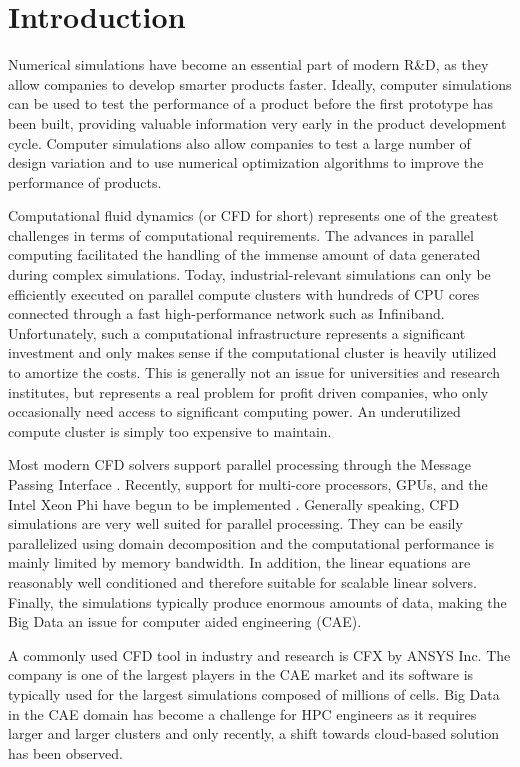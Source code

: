 \documentclass[3p,times]{elsarticle}
\begin{document}

\section{Introduction} 
\label{sec:introduction}

Numerical simulations have become an essential part of modern R\&D, as they allow companies to develop smarter products faster. Ideally, computer simulations can be used to test the performance of a product before the first prototype has been built, providing valuable information very early in the product development cycle. Computer simulations also allow companies to test a large number of design variation and to use numerical optimization algorithms to improve the performance of products.
 
Computational fluid dynamics (or CFD for short) represents one of the greatest challenges in terms of computational requirements. The advances in parallel computing facilitated the handling of the immense amount of data generated during complex simulations. Today, industrial-relevant simulations can only be efficiently executed on parallel compute clusters with hundreds of CPU cores connected through a fast high-performance network such as Infiniband. Unfortunately, such a computational infrastructure represents a significant investment and only makes sense if the computational cluster is heavily utilized to amortize the costs. This is generally not an issue for universities and research institutes, but represents a real problem for profit driven companies, who only occasionally need access to significant computing power. An underutilized compute cluster is simply too expensive to maintain.
 
Most modern CFD solvers support parallel processing through the Message Passing Interface \cite{MPI}. Recently, support for multi-core processors, GPUs, and the Intel Xeon Phi have begun to be implemented \cite{tomczak2013} \cite{Che09042015}. Generally speaking, CFD simulations are very well suited for parallel processing. They can be easily parallelized using domain decomposition and the computational performance is mainly limited by memory bandwidth. In addition, the linear equations are reasonably well conditioned and therefore suitable for scalable linear solvers. Finally, the simulations typically produce enormous amounts of data, making the Big Data an issue for computer aided engineering (CAE).

A commonly used CFD tool in industry and research is CFX by ANSYS Inc. The company is one of the largest players in the CAE market \cite{mcae2012} and its software is typically used for the largest simulations composed of millions of cells. Big Data in the CAE domain has become a challenge for HPC engineers as it requires larger and larger clusters and only recently, a shift towards cloud-based solution has been observed.
\end{document}
